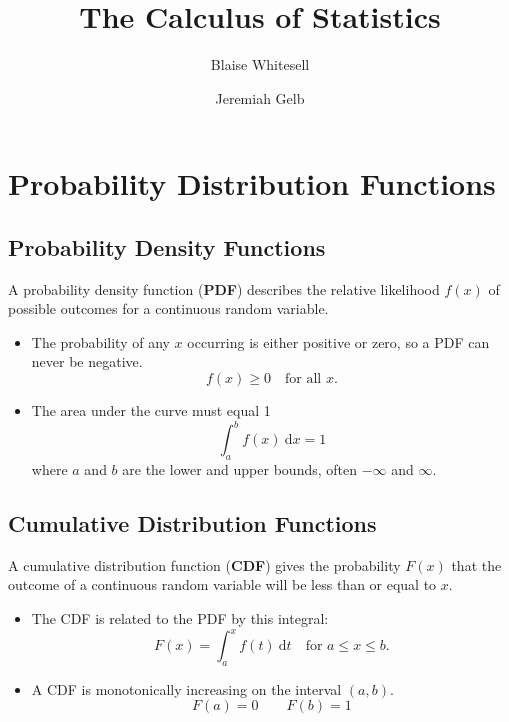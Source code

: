 \documentclass[11pt,leqno,letterpaper]{article}
\title{\Huge{The Calculus of Statistics}}
\author{\Large{Blaise Whitesell} \and \Large{Jeremiah Gelb}}
\begin{document}
\newcommand{\bdef}[1]{\textbf{#1}} %
\newcommand{\dx}{\:\mathrm{d}x} %
\newcommand{\dt}{\:\mathrm{d}t} %
\newcommand{\dth}{\:\mathrm{d}\theta} %
\newcommand{\du}{\:\mathrm{d}u} %
\newcommand{\dv}{\:\mathrm{d}v} %
\newcommand{\dr}{\:\mathrm{d}r} %
\newcommand{\deriv}[2]{\frac{\mathrm{d}#1}{\mathrm{d}#2}}
\theoremstyle{definition} \newtheorem{problem}{Problem}
\newcommand{\psep}{\hrule } %
\newcommand{\AM}{\textsc{am}}
\maketitle
\thispagestyle{fancy}
\vspace{2 em}
\section{Probability Distribution Functions}
\subsection{Probability Density Functions}
A probability density function (\bdef{PDF}) describes
the relative likelihood $f(x)$ of possible outcomes
for a continuous random variable.
\begin{itemize}
\item The probability of any $x$ occurring is either positive or zero,
so a PDF can never be negative.
\[
f(x) \geq 0 \quad \text{for all }x.
\]
\item The area under the curve must equal 1
\[
\int_a^b f(x)\dx = 1
\]
where $a$ and $b$ are the lower and upper bounds,
often $-\infty$ and $\infty$.
\end{itemize}
\subsection{Cumulative Distribution Functions}
A cumulative distribution function (\bdef{CDF}) gives
the probability $F(x)$ that the outcome of a
continuous random variable will be less than or equal to $x$.
\begin{itemize}
\item The CDF is related to the PDF by this integral:
\[
F(x) = \int_a^x f(t) \dt \quad \text{for } a \leq x \leq b.
\]
\item A CDF is monotonically increasing on the interval $(a,b)$.
\[
F(a) = 0 \qquad F(b) = 1
\]
\end{itemize}
\end{document}
